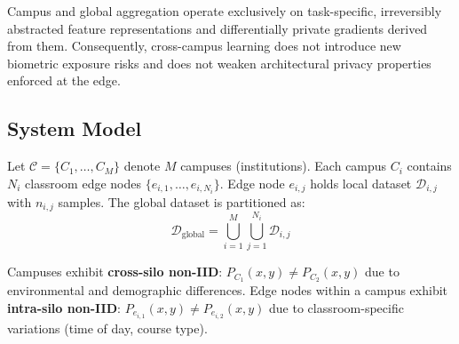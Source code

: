 \documentclass[conference]{IEEEtran}
\begin{document}
Campus and global aggregation operate exclusively on task-specific, irreversibly abstracted feature representations and differentially private gradients derived from them. Consequently, cross-campus learning does not introduce new biometric exposure risks and does not weaken architectural privacy properties enforced at the edge.

\subsection{System Model}

Let $\mathcal{C} = \{C_1, \ldots, C_M\}$ denote $M$ campuses (institutions). Each campus $C_i$ contains $N_i$ classroom edge nodes $\{e_{i,1}, \ldots, e_{i,N_i}\}$. Edge node $e_{i,j}$ holds local dataset $\mathcal{D}_{i,j}$ with $n_{i,j}$ samples. The global dataset is partitioned as:
\[
\mathcal{D}_{\text{global}} = \bigcup_{i=1}^{M} \bigcup_{j=1}^{N_i} \mathcal{D}_{i,j}
\]

Campuses exhibit \textbf{cross-silo non-IID}: $P_{C_1}(x,y) \neq P_{C_2}(x,y)$ due to environmental and demographic differences. Edge nodes within a campus exhibit \textbf{intra-silo non-IID}: $ P_{e_{i,1}}(x,y) \neq P_{e_{i,2}}(x,y)$ due to classroom-specific variations (time of day, course type).
\end{document}
